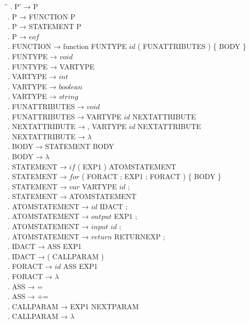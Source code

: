 \begin{tabbing}
    \hspace{1cm}\=\hspace{10cm}\=\kill
    . P' → P\\
    . P → FUNCTION P\\
    . P → STATEMENT P\\
    . P → $eof$\\
    . FUNCTION → function FUNTYPE $id$ ( FUNATTRIBUTES ) \{ BODY \}\\
    . FUNTYPE → $void$\\
    . FUNTYPE → VARTYPE\\
    . VARTYPE → $int$\\
    . VARTYPE → $boolean$\\
    . VARTYPE → $string$\\
    . FUNATTRIBUTES → $void$\\
    . FUNATTRIBUTES → VARTYPE $id$ NEXTATTRIBUTE\\
    . NEXTATTRIBUTE → , VARTYPE $id$ NEXTATTRIBUTE\\
    . NEXTATTRIBUTE → $\lambda$\\
    . BODY → STATEMENT BODY\\
    . BODY → $\lambda$\\
    . STATEMENT → $if$ ( EXP1 ) ATOMSTATEMENT\\
    . STATEMENT → $for$ ( FORACT ; EXP1 ; FORACT ) \{ BODY \}\\
    . STATEMENT → $var$ VARTYPE $id$ ;\\
    . STATEMENT → ATOMSTATEMENT\\
    . ATOMSTATEMENT → $id$ IDACT ;\\
    . ATOMSTATEMENT → $output$ EXP1 ;\\
    . ATOMSTATEMENT → $input$ $id$ ;\\
    . ATOMSTATEMENT → $return$ RETURNEXP ;\\
    . IDACT → ASS EXP1\\
    . IDACT → ( CALLPARAM )\\
    . FORACT → $id$ ASS EXP1\\
    . FORACT → $\lambda$\\
    . ASS → =\\
    . ASS → +=\\
    . CALLPARAM → EXP1 NEXTPARAM\\
    . CALLPARAM → $\lambda$\\

\end{tabbing}
